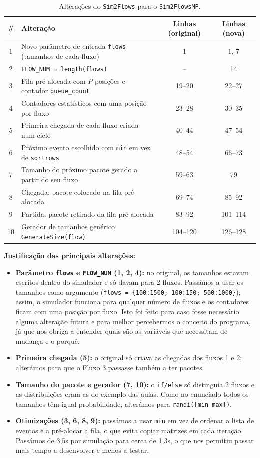 \documentclass[11pt,a4paper]{article}
\newcommand{\code}[1]{\texttt{#1}}
\begin{document}
\begin{table}[H]
\centering
\caption{Alterações do \code{Sim2Flows} para o \code{Sim2FlowsMP}.}
\label{tab:alt1}
\begin{tabularx}{\textwidth}{c X c c}
\toprule
\# & Alteração & Linhas (original) & Linhas (nova) \\
\midrule
1  & Novo parâmetro de entrada \code{flows} (tamanhos de cada fluxo) & 1 & 1, 7 \\
2  & \code{FLOW\_NUM = length(flows)} & -- & 14 \\
3  & Fila pré-alocada com $P$ posições e contador \code{queue\_count} & 19--20 & 22--27 \\
4  & Contadores estatísticos com uma posição por fluxo & 23--28 & 30--35 \\
5  & Primeira chegada de cada fluxo criada num ciclo & 40--44 & 47--54 \\
6  & Próximo evento escolhido com \code{min} em vez de \code{sortrows} & 48--54 & 66--73 \\
7  & Tamanho do próximo pacote gerado a partir do seu fluxo & 59--63 & 79 \\
8  & Chegada: pacote colocado na fila pré-alocada & 69--74 & 85--92 \\
9  & Partida: pacote retirado da fila pré-alocada & 83--92 & 101--114 \\
10 & Gerador de tamanhos genérico \code{GenerateSize(flow)} & 104--120 & 126--128 \\
\bottomrule
\end{tabularx}
\end{table}

\textbf{Justificação das principais alterações:}
\begin{itemize}
  \item \textbf{Parâmetro \code{flows} e \code{FLOW\_NUM} (1, 2, 4):} no original, os tamanhos estavam escritos dentro do simulador e só davam para 2 fluxos. Passámos a usar os tamanhos como argumento (\code{flows = \{100:1500; 100:150; 500:1000\}}); assim, o simulador funciona para qualquer número de fluxos e os contadores ficam com uma posição por fluxo. Isto foi feito para caso fosse necessário alguma alteração futura e para melhor percebermos o conceito do programa, já que nos obriga a entender quais são as variáveis que necessitam de mudança e o porquê.
  \item \textbf{Primeira chegada (5):} o original só criava as chegadas dos fluxos 1 e 2; alterámos para que o Fluxo 3 passasse também a ter pacotes.
  \item \textbf{Tamanho do pacote e gerador (7, 10):} o \code{if/else} só distinguia 2 fluxos e as distribuições eram as do exemplo das aulas. Como no enunciado todos os tamanhos têm igual probabilidade, alterámos para \code{randi([min max])}.
  \item \textbf{Otimizações (3, 6, 8, 9):} passámos a usar \code{min} em vez de ordenar a lista de eventos e a pré-alocar a fila, o que evita copiar matrizes em cada iteração.
  Passámos de 3,5s por simulação para cerca de 1,3s, o que nos permitiu passar mais tempo a desenvolver e menos a testar.
\end{itemize}
\end{document}
